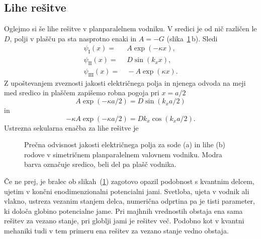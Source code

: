 \subsection*{Lihe rešitve}
Oglejmo si še lihe rešitve v planparalelnem vodniku. V sredici je od nič različen
le $D$, polji v plašču pa sta nasprotno enaki in $A = -G$ (slika~\ref{fig:TESodi}\,b). Sledi
\begin{align}
\psi_{\mathrm{I}}(x) =&~ A \exp(-\kappa x),\\
\psi_{\mathrm{II}}(x) =&~ D \sin(k_x x),\\
\psi_{\mathrm{III}}(x) =&~ -A \exp(\kappa x).
\end{align}
Z upoštevanjem zveznosti jakosti električnega polja in njenega odvoda na 
meji med sredico in plaščem zapišemo robna pogoja pri $x=a/2$
\begin{equation}
A \exp(-\kappa a/2) = D \sin(k_x a/2)
\end{equation}
in 
\begin{equation}
-\kappa A \exp(-\kappa a/2) = D k_x \cos(k_x a/2).
\end{equation}
Ustrezna sekularna enačba za lihe rešitve je
\begin{figure}[h]
\centering
\def\svgwidth{130truemm} 
 
\caption{Prečna odvisnost jakosti električnega polja za sode (a) in lihe (b) rodove v 
simetričnem planparalelnem valovnem vodniku. Modra barva označuje sredico, beli del 
pa plašč vodnika. 
}
\label{fig:TESodi}
\end{figure}

\begin{remark}
Če ne prej, je bralec ob slikah~(\ref{fig:TESodi}) zagotovo opazil podobnost s kvantnim 
delcem, ujetim v končni enodimenzionalni potencialni jami. Svetloba, ujeta v vodnik ali
vlakno, ustreza vezanim stanjem delca, numerična odprtina pa je tisti parameter, 
ki določa globino potencialne jame. Pri majhnih vrednostih obstaja ena sama rešitev 
za vezano stanje, pri globlji jami je rešitev več. Podobno kot v kvantni mehaniki
tudi v tem primeru ena rešitev za vezano stanje vedno obstaja. 
\end{remark}

